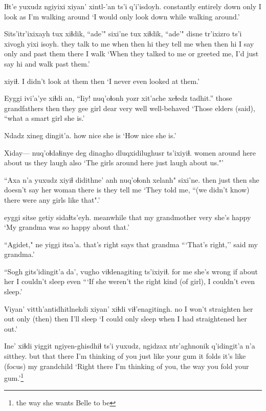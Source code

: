 \documentclass[12pt]{article}
\begin{document}
\gll Iɬt'e      yuxudz   ngiyixi xiyan' xintl-'an ts'i q'i'isdoyh.
constantly entirely down    only   {I look}  as   {I'm walking around}
\glt `I would only look down while walking around.'
\glend

\gll Sits'itr'ixixayh tux  xiɬdik, ``ade'" sixi'ne   tux xiɬdik, ``ade'" disne tr'ixizro ts'i xivogh yixi isoyh.
{they talk to me}  when then   hi   {they tell me}  when then hi   {I say} only  and  {past them} there {I walk}
\glt `When they talked to me or greeted me, I'd just say hi and walk past them.'
\glend

 xiyiɬ.
{I didn't look at them} then
\glt `I never even looked at them.'
\glend

\gll Eyggi ivi'a'ye      xiɬdi an, ``Iiy! nuq'oɬonh yozr xit'ache xeɬedz tadhit.''
those  grandfathers then they  gee    girl      dear       very well {well-behaved}
\glt `Those elders (said), ``what a smart girl she is.'
\glend

\gll Ndadz xineg dingit'a.
how   nice  {she is}    
\glt `How nice she is.'
\glend

\gll Xiday--- nuq'oɬdaɬinye deg         dinagho dluqxidilughusr ts'ixiyiɬ.
{} women         {around here} {about us} {they laugh} also
\glt `The girls around here just laugh about us."'
\glend

\gll ``Axa n'a yuxudz xiyiɬ didithne'          anh nuq'oɬonh xelanh"   sixi'ne.
    then {} just then  {she doesn't say} her  woman     {there is} {they tell me}
\glt `They told me, ``(we didn't know) there were any girls like that".'
\glend

 eyggi sitse         getiy sidaɬts'eyh.
meanwhile     that  {my grandmother} very  {she's happy }
\glt `My grandma was so happy about that.'
\glend

\gll ``Agidet,"      ne   yiggi itsa'a.
{that's right} says that  grandma
\glt ```That's right,'' said my grandma.'
\glend

\gll ``Sogh   gits'idingit'a da', vugho     viɬdenagiting     ts'ixiyiɬ.
{for me} {she's wrong}    if   {about her} {I couldn't sleep} even
\glt ```If she weren't the right kind (of girl), I couldn't even sleep.'
\glend

\gll Viyan' vitth'antidhitlnekdi xiyan' xiɬdi viɬ'enagitingh.
no   {I won't straighten her out}  {only (then)}  then  {I'll sleep}
\glt `I could only sleep when I had straightened her out.'
\glend

\gll Ine' xiɬdi yiggit ngiyen-ghisdhiɬ     ts'i yuxudz,    ngidzax  ntr'aghnonik q'idingit'a n'a  sitthey.
but  that  there  {I'm thinking of you} {} {just like} {your gum} {it folds} {it's like} {(focus)} {my grandchild}
\glt `Right there I'm thinking of you, the way you fold your gum.'\footnote{the way she wants Belle to be}
\glend
\end{document}
